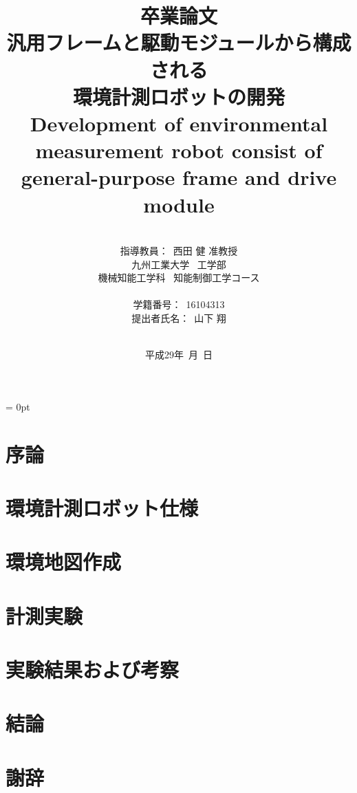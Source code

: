 \documentclass[a4paper,12pt]{ujarticle}
\title{卒業論文\\
汎用フレームと駆動モジュールから構成される\\環境計測ロボットの開発\\
{\large Development of environmental measurement robot consist of general-purpose frame and drive module}
}
\author{\vspace{20mm}\\
指導教員：\ 西田 \hspace{0mm} 健 准教授\\
九州工業大学\ \hspace{0mm} 工学部\\
機械知能工学科\ \hspace{0mm} 知能制御工学コース \\
\vspace{0mm}\\
学籍番号：\ 16104313\\
提出者氏名：\ 山下 \hspace{0mm} 翔\\\vspace{5mm}\\ }
\date{平成29年\ 月\ 日}
\begin{document}
\titlepage
\maketitle
\thispagestyle{empty} \newpage
{}
\setcounter{page}{1}
\parindent = 0pt %

\begin{abstract}

\end{abstract}
\thispagestyle{empty}
\newpage
\thispagestyle{empty}
\tableofcontents
\newpage
\section{序論} \label{intro}

\newpage
\section{環境計測ロボット仕様} \label{spec}

\newpage
\section{環境地図作成} \label{mapping}

\newpage
\section{計測実験} \label{experiment}


\newpage
\section{実験結果および考察} \label{result}

\newpage
\section{結論} \label{conclusion}

\section*{謝辞} \label{thanks}
\end{document}
